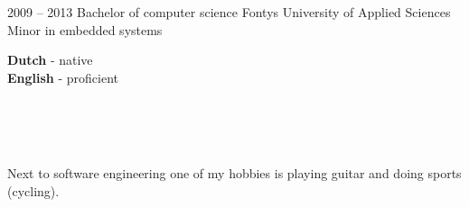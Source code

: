 \documentclass[9pt]{developercv} %
\begin{document}


\begin{entrylist}
	\entry
		{2009 -- 2013}
		{Bachelor of computer science}
        {Fontys University of Applied Sciences}
        {Minor in embedded systems}
\end{entrylist}


\begin{minipage}[t]{0.3\textwidth}
	\vspace{-\baselineskip} %

	\textbf{Dutch} - native\\
	\textbf{English} - proficient\\
\end{minipage}\\\\\\
\begin{minipage}[t]{0.3\textwidth}
	\vspace{-\baselineskip} %

	Next to software engineering one of my hobbies is playing guitar and doing sports (cycling).
\end{minipage}

\end{document}
